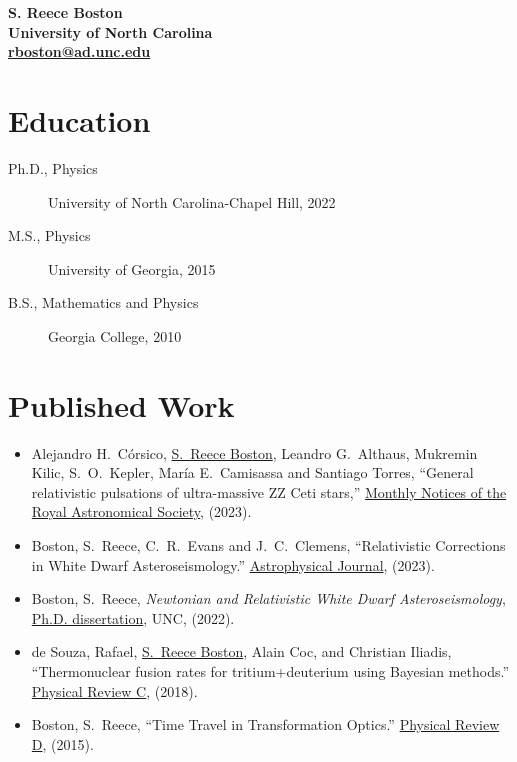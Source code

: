 \documentclass[11pt]{article}
\begin{document}
\begin{center}
{\bf \large S. Reece Boston}\\
{\bf University of North Carolina}\\
{\bf \href{mailto:rboston@ad.unc.edu}{rboston@ad.unc.edu}}
\end{center}

\section*{Education}
\begin{minipage}{\textwidth}
	\begin{description}
		\item[Ph.D., Physics] University of North Carolina-Chapel Hill, 2022
		\item[M.S., Physics] University of Georgia, 2015%
		\item[B.S., Mathematics and Physics] Georgia College, 2010%
	\end{description}
\end{minipage}

\section*{Published Work}
%
\begin{itemize}
		\item Alejandro H.~C\'orsico, \underline{S.~Reece Boston}, Leandro G.~Althaus, Mukremin Kilic,
S.~O.~Kepler, Mar\'ia E.~Camisassa and Santiago Torres, ``General relativistic pulsations of ultra-massive ZZ Ceti stars,'' \href{https://doi.org/10.1093/mnras/stad2248}{Monthly Notices of the Royal Astronomical Society}, (2023).
		\item Boston, S.~Reece, C.~R.~Evans and J.~C.~Clemens, ``Relativistic Corrections in White Dwarf Asteroseismology.'' \href{https://iopscience.iop.org/article/10.3847/1538-4357/acd446}{Astrophysical Journal}, (2023).
		\item Boston, S.~Reece, \emph{Newtonian and Relativistic White Dwarf Asteroseismology}, \href{https://cdr.lib.unc.edu/concern/dissertations/jw827n44n?locale=en}{Ph.D. dissertation}, UNC, (2022).
		\item de Souza, Rafael, \underline{S.~Reece Boston}, Alain Coc, and Christian Iliadis, ``Thermonuclear fusion rates for tritium+deuterium using Bayesian methods.''  \href{http://journals.aps.org/prc/abstract/10.1103/PhysRevC.99.014619}{Physical Review C}, (2018).
		\item Boston, S.~Reece, ``Time Travel in Transformation Optics.''  \href{http://journals.aps.org/prd/abstract/10.1103/PhysRevD.91.124035}{Physical Review D}, (2015).
\end{itemize}
\end{document}
